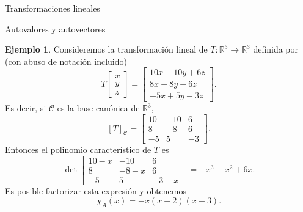 \documentclass[a4paper,12pt,twoside,spanish,reqno]{amsbook}
\numberwithin{equation}{section}
\theoremstyle{definition}
\newtheorem{ejemplo}[teorema]{Ejemplo}
\theoremstyle{remark}
\newtheorem*{ejemplo*}{Ejemplo}
\newcommand{\R}{\mathbb R}
\begin{document}
\begin{chapter}{Transformaciones lineales}
\begin{section}{Autovalores y autovectores}
        
        \begin{ejemplo} \label{ej-autovectores}
            Consideremos la transformación lineal de $T:\R^3 \to \R^3$  definida por (con abuso de notación incluido)
            \begin{equation*}
                T
                \begin{bmatrix} x\\y\\z \end{bmatrix} =
                \begin{bmatrix} 10x-10y+6z\\8x -8y +6z \\-5x+5y-3z\end{bmatrix}.
            \end{equation*}
            Es decir,  si $\mathcal C$ es la base canónica de $\R^3$, 
            $$ 
            [T]_{\mathcal C}=\begin{bmatrix}10&-10&6\\8& -8& 6\\-5& 5& -3\end{bmatrix}.
            $$
            Entonces el  polinomio característico de $T$ es
            $$
            \det \begin{bmatrix}10-x&-10&6\\8& -8-x& 6\\-5& 5& -3-x\end{bmatrix} = -x^3  - x^2 + 6 x .
            $$
            Es posible factorizar esta expresión y obtenemos
            $$
            \chi_A(x) = -x (x-2)(x+3).
            $$
        \end{ejemplo}
        
    \begin{comment}
        \begin{ejemplo*}
        Sea
        $$ 
        A=\begin{bmatrix}1&2&1\\ 6&-1&0\\ -1&-2&-1\end{bmatrix},
        $$
        entonces el  polinomio característico de $A$ es
        $$
        \det \begin{bmatrix}1-x&2&1\\ 6&-1-x&0\\ -1&-2&-1-x\end{bmatrix} = -x^3 - x^2 + 12 x.
        $$
        Es posible factorizar esta expresión y obtenemos
        $$
        \chi_A(x) = -x(x-3)(x+4).
        $$
        \end{ejemplo*}
    \end{comment}	
        

\end{section}
\end{chapter}
\end{document}
